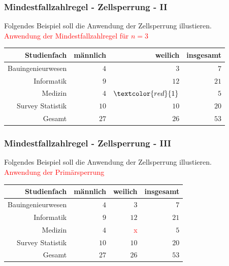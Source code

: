\documentclass[aspectratio=169]{beamer}
\begin{document}
\begin{frame}
    \frametitle{Mindestfallzahlregel - Zellsperrung - II}
    Folgendes Beispiel soll die Anwendung der Zellsperrung illustieren. \\
    \textcolor{red}{Anwendung der Mindestfallzahlregel für $n = 3$}
    \begin{center}
        \begin{tabular}{ r r r r }
         \textbf{Studienfach} \vline & \textbf{männlich} & \textbf{weilich} & \textbf{insgesamt} \\ 
         \hline
         Bauingenieurwesen \vline & $4$ & $3$ & $7$ \\
         Informatik \vline & $9$ & $12$ & $21$ \\  
         Medizin \vline & $4$ & $\textcolor{red}{1}$ & $5$ \\
         Survey Statistik \vline & $10$ & $10$ & $20$ \\
         \hline
         Gesamt \vline & $27$ & $26$ & $53$
        \end{tabular}
    \end{center}
\end{frame}


\begin{frame}
    \frametitle{Mindestfallzahlregel - Zellsperrung - III}
    Folgendes Beispiel soll die Anwendung der Zellsperrung illustieren. \\
    \textcolor{red}{Anwendung der Primärsperrung}
    \begin{center}
        \begin{tabular}{ r r r r }
         \textbf{Studienfach} \vline & \textbf{männlich} & \textbf{weilich} & \textbf{insgesamt} \\ 
         \hline
         Bauingenieurwesen \vline & $4$ & $3$ & $7$ \\
         Informatik \vline & $9$ & $12$ & $21$ \\  
         Medizin \vline & $4$ & \textcolor{red}{x} & $5$ \\
         Survey Statistik \vline & $10$ & $10$ & $20$ \\
         \hline
         Gesamt \vline & $27$ & $26$ & $53$
        \end{tabular}
    \end{center}
\end{frame}
\end{document}
